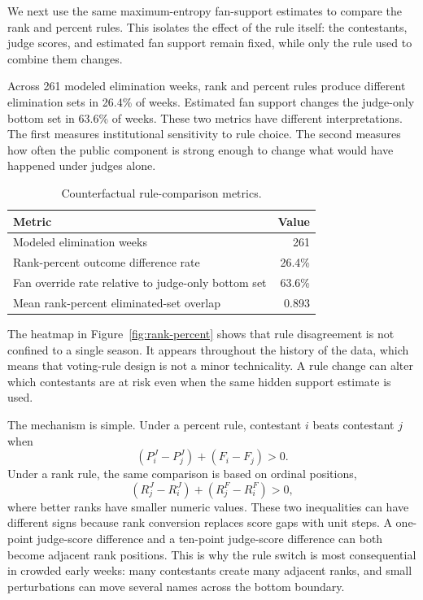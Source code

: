 \documentclass[12pt]{article}
\begin{document}
We next use the same maximum-entropy fan-support estimates to compare the rank
and percent rules. This isolates the effect of the rule itself: the contestants,
judge scores, and estimated fan support remain fixed, while only the rule used
to combine them changes.

Across 261 modeled elimination weeks, rank and percent rules produce different
elimination sets in 26.4\% of weeks. Estimated fan support changes the
judge-only bottom set in 63.6\% of weeks. These two metrics have different
interpretations. The first measures institutional sensitivity to rule choice.
The second measures how often the public component is strong enough to change
what would have happened under judges alone.

\begin{table}[!htbp]
  \centering
  \caption{Counterfactual rule-comparison metrics.}
  \label{tab:rule-comparison}
  \begin{tabular}{lr}
    \toprule
    Metric & Value \\
    \midrule
    Modeled elimination weeks & 261 \\
    Rank-percent outcome difference rate & 26.4\% \\
    Fan override rate relative to judge-only bottom set & 63.6\% \\
    Mean rank-percent eliminated-set overlap & 0.893 \\
    \bottomrule
  \end{tabular}
\end{table}

The heatmap in Figure~\ref{fig:rank-percent} shows that rule disagreement is
not confined to a single season. It appears throughout the history of the data,
which means that voting-rule design is not a minor technicality. A rule change
can alter which contestants are at risk even when the same hidden support
estimate is used.

The mechanism is simple. Under a percent rule, contestant $i$ beats contestant
$j$ when
\[
  (P_i^J-P_j^J)+(F_i-F_j)>0 .
\]
Under a rank rule, the same comparison is based on ordinal positions,
\[
  (R_j^J-R_i^J)+(R_j^F-R_i^F)>0 ,
\]
where better ranks have smaller numeric values. These two inequalities can
have different signs because rank conversion replaces score gaps with unit
steps. A one-point judge-score difference and a ten-point judge-score
difference can both become adjacent rank positions. This is why the rule
switch is most consequential in crowded early weeks: many contestants create
many adjacent ranks, and small perturbations can move several names across the
bottom boundary.
\end{document}
